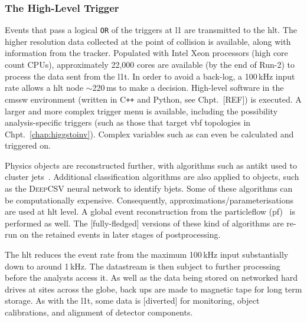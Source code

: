 

\subsubsection{The High-Level Trigger}
\label{subsubsec:detector_hlt}

Events that pass a logical \texttt{OR} of the triggers at \acrlong{l1} are transmitted to the \acrshort{hlt}. The higher resolution data collected at the point of collision is available, along with information from the tracker. Populated with Intel Xeon processors (high core count CPUs), approximately 22,000 cores are available (by the end of Run-2) to process the data sent from the \acrshort{l1t}. In order to avoid a back-log, a 100\,kHz input rate allows a \acrshort{hlt} node $\sim$220\,ms to make a decision. High-level software in the \acrshort{cmssw} environment (written in C\texttt{++} and Python, see Chpt.~[REF]) %
is executed. A larger and more complex trigger menu is available, including the possibility analysis-specific triggers (such as those that target \acrshort{vbf} topologies in Chpt.~\ref{chap:higgstoinv}). Complex variables such as \alphaT can even be calculated and triggered on.

Physics objects are reconstructed further, with algorithms such as \gls{antikt} used to cluster \glspl{jet}~\cite{Cacciari:2008gp}. Additional classification algorithms are also applied to objects, such as the \textsc{DeepCSV} neural network to identify \glspl{bjet}. Some of these algorithms can be computationally expensive. Consequently, approximations/parameterisations are used at \acrshort{hlt} level. A global event reconstruction from the \gls{particleflow} (\acrshort{pf})~\cite{CMS-PAS-PFT-09-001,CMS-PRF-14-001} is performed as well. The [fully-fledged] versions of these kind of algorithms are re-run on the retained events in later stages of postprocessing.

The \acrshort{hlt} reduces the event rate from the maximum 100\,kHz input substantially down to around 1\,kHz. The datastream  is then subject to further processing before the analysts access it. As well as the data being stored on networked hard drives at sites across the globe, back ups are made to magnetic tape for long term storage. As with the \acrlong{l1t}, some data is [diverted] for monitoring, object calibrations, and alignment of detector components.

